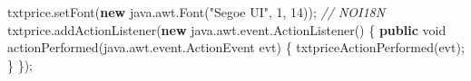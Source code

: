 \documentclass[
  10pt,
]{article}
\newenvironment{Shaded}{}{}
\newcommand{\CommentTok}[1]{\textcolor[rgb]{0.38,0.63,0.69}{\textit{#1}}}
\newcommand{\DataTypeTok}[1]{\textcolor[rgb]{0.56,0.13,0.00}{#1}}
\newcommand{\DecValTok}[1]{\textcolor[rgb]{0.25,0.63,0.44}{#1}}
\newcommand{\FunctionTok}[1]{\textcolor[rgb]{0.02,0.16,0.49}{#1}}
\newcommand{\KeywordTok}[1]{\textcolor[rgb]{0.00,0.44,0.13}{\textbf{#1}}}
\newcommand{\NormalTok}[1]{#1}
\newcommand{\OperatorTok}[1]{\textcolor[rgb]{0.40,0.40,0.40}{#1}}
\newcommand{\StringTok}[1]{\textcolor[rgb]{0.25,0.44,0.63}{#1}}
\begin{document}
\begin{Shaded}
\begin{Highlighting}[numbers=left,,]
\NormalTok{        txtprice}\OperatorTok{.}\FunctionTok{setFont}\OperatorTok{(}\KeywordTok{new}\NormalTok{ java}\OperatorTok{.}\FunctionTok{awt}\OperatorTok{.}\FunctionTok{Font}\OperatorTok{(}\StringTok{"Segoe UI"}\OperatorTok{,} \DecValTok{1}\OperatorTok{,} \DecValTok{14}\OperatorTok{));} \CommentTok{// NOI18N}
\NormalTok{        txtprice}\OperatorTok{.}\FunctionTok{addActionListener}\OperatorTok{(}\KeywordTok{new}\NormalTok{ java}\OperatorTok{.}\FunctionTok{awt}\OperatorTok{.}\FunctionTok{event}\OperatorTok{.}\FunctionTok{ActionListener}\OperatorTok{()} \OperatorTok{\{}
            \KeywordTok{public} \DataTypeTok{void} \FunctionTok{actionPerformed}\OperatorTok{(}\NormalTok{java}\OperatorTok{.}\FunctionTok{awt}\OperatorTok{.}\FunctionTok{event}\OperatorTok{.}\FunctionTok{ActionEvent}\NormalTok{ evt}\OperatorTok{)} \OperatorTok{\{}
                \FunctionTok{txtpriceActionPerformed}\OperatorTok{(}\NormalTok{evt}\OperatorTok{);}
            \OperatorTok{\}}
        \OperatorTok{\});}


\end{Highlighting}
\end{Shaded}
\end{document}
